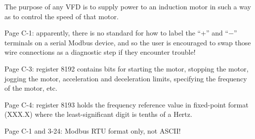 












The purpose of any VFD is to supply power to an induction motor in such a way as to control the speed of that motor.

\vskip 10pt

Page C-1: apparently, there is no standard for how to label the ``+'' and ``$-$'' terminals on a serial Modbus device, and so the user is encouraged to swap those wire connections as a diagnostic step if they encounter trouble!  

\vskip 10pt

Page C-3: register 8192 contains bits for starting the motor, stopping the motor, jogging the motor, acceleration and deceleration limits, specifying the frequency of the motor, etc.

\vskip 10pt

Page C-4: register 8193 holds the frequency reference value in fixed-point format (XXX.X) where the least-significant digit is tenths of a Hertz.

\vskip 10pt

Page C-1 and 3-24: Modbus RTU format only, not ASCII!



